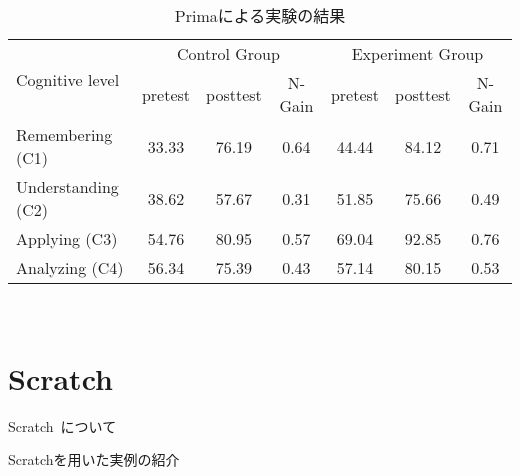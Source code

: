 \begin{table}[h]
\centering
\begin{tabular}{lcccccc}
  \toprule
  \multirow{2}{*}{Cognitive level} & \multicolumn{3}{c}{Control Group} & \multicolumn{3}{c}{Experiment Group}\\
  \cmidrule(lr){2-4} \cmidrule(lr){5-7}
  & pretest & posttest & N-Gain & pretest & posttest & N-Gain\\
  \midrule
  Remembering (C1) & 33.33 & 76.19 & 0.64 & 44.44 & 84.12 & 0.71\\
  Understanding (C2) & 38.62 & 57.67 & 0.31 & 51.85 & 75.66 & 0.49\\
  Applying (C3) & 54.76 & 80.95 & 0.57 & 69.04 & 92.85 & 0.76\\
  Analyzing (C4) & 56.34 & 75.39 & 0.43 & 57.14 & 80.15 & 0.53\\
  \bottomrule
\end{tabular}

\caption{Primaによる実験の結果}
\label{prima_table}
\end{table}





~\cite{rehman_teaching_2021}

\section{Scratch}

Scratch~\cite{Scratch}について

Scratchを用いた実例の紹介
~\cite{Lpez2015ScratchAA}


